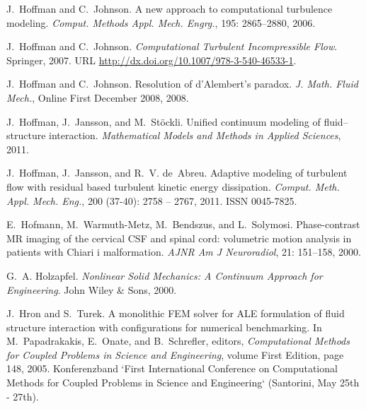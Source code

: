 \begin{thebibliography}{467}
J.~Hoffman and C.~Johnson.
\newblock A new approach to computational turbulence modeling.
\newblock \emph{Comput. Methods Appl. Mech. Engrg.}, 195: 2865--2880,
  2006.

J.~Hoffman and C.~Johnson.
\newblock \emph{Computational Turbulent Incompressible Flow}.
\newblock Springer, 2007.
\newblock URL \url{http://dx.doi.org/10.1007/978-3-540-46533-1}.

J.~Hoffman and C.~Johnson.
\newblock Resolution of d'Alembert's paradox.
\newblock \emph{J. Math. Fluid Mech.}, Online First December 2008, 2008.

J.~Hoffman, J.~Jansson, and M.~St\"ockli.
\newblock Unified continuum modeling of fluid--structure interaction.
\newblock \emph{Mathematical Models and Methods in Applied Sciences}, 2011.

J.~Hoffman, J.~Jansson, and R.~V. de~Abreu.
\newblock Adaptive modeling of turbulent flow with residual based turbulent
  kinetic energy dissipation.
\newblock \emph{Comput. Meth. Appl. Mech. Eng.}, 200 (37-40):
  2758 -- 2767, 2011{}.
\newblock ISSN 0045-7825.

E.~Hofmann, M.~Warmuth-Metz, M.~Bendszus, and L.~Solymosi.
\newblock Phase-contrast {MR} imaging of the cervical {CSF} and spinal cord:
  volumetric motion analysis in patients with {C}hiari i malformation.
\newblock \emph{AJNR Am J Neuroradiol}, 21: 151--158, 2000.

G.~A. Holzapfel.
\newblock \emph{Nonlinear Solid Mechanics: A Continuum Approach for
  Engineering}.
\newblock John Wiley \& Sons, 2000.

J.~Hron and S.~Turek.
\newblock A monolithic {FEM} solver for {ALE} formulation of fluid structure
  interaction with configurations for numerical benchmarking.
\newblock In M.~Papadrakakis, E.~Onate, and B.~Schrefler, editors,
  \emph{Computational Methods for Coupled Problems in Science and Engineering},
  volume First Edition, page 148, 2005.
\newblock Konferenzband `First International Conference on Computational
  Methods for Coupled Problems in Science and Engineering` (Santorini, May 25th
  - 27th).


\end{thebibliography}
